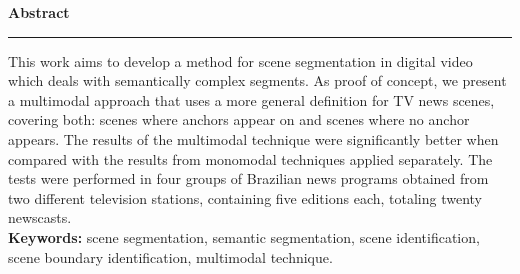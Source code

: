
{\huge{\textbf{Abstract}}}

\hspace{-0.5cm}\rule{\linewidth}{2pt}

\vspace{3cm}

This work aims to develop a method for scene segmentation in digital video which deals with semantically complex segments. As proof of concept, we present a multimodal approach that uses a more general definition for TV news scenes, covering both: scenes where anchors appear on and scenes where no anchor appears. The results of the multimodal technique were significantly better when compared with the results from monomodal techniques applied separately. The tests were performed in four groups of Brazilian news programs obtained from two different television stations, containing five editions each, totaling twenty newscasts.\\

\textbf{Keywords:} scene segmentation, semantic segmentation, scene identification, scene boundary identification, multimodal technique.
